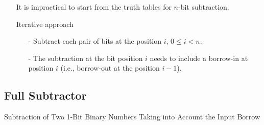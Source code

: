 \documentclass[12pt,openany, tikz,border=10pt]{book}
\begin{document}
\begin{itemize}
  \item[] It is impractical to start from the truth tables for \( n \)-bit subtraction.
  \item[] Iterative approach
  \begin{itemize}
    \item[-] Subtract each pair of bits at the position \( i \), \( 0 \leq i < n \).
    \item[-] The subtraction at the bit position \( i \) needs to include a borrow-in at position \( i \) (i.e., borrow-out at the position \( i - 1 \)).
  \end{itemize}
\end{itemize}

\subsection{Full Subtractor}
Subtraction of Two 1-Bit Binary Numbers Taking into Account the Input Borrow
\end{document}

